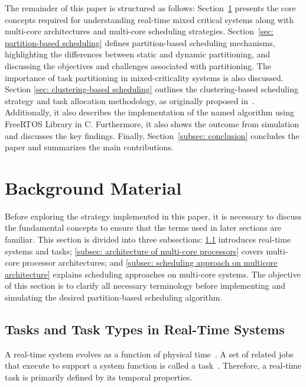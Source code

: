 \documentclass[conference]{IEEEtran}
\begin{document}
The remainder of this paper is structured as follows: 
Section~\ref{sec:fundamentals} presents the core concepts required for understanding real-time mixed critical systems along with multi-core architectures and multi-core scheduling strategies.
Section~\ref{sec: partition-based scheduling} defines partition-based scheduling mechanisms, highlighting the differences between static and dynamic partitioning, and discussing the objectives and challenges associated with partitioning. The importance of task partitioning in mixed-criticality systems is also discussed. 
Section \ref{sec: clustering-based scheduling} outlines the clustering-based scheduling strategy and task allocation methodology, as originally proposed in~\cite{AbdallahGB24}. Additionally, it also 
describes the implementation of the named algorithm using FreeRTOS Library in C. Furthermore, it also shows the outcome from simulation and discusses the key findings. 
Finally, Section~\ref{subsec: conclusion} concludes the paper and summarizes the main contributions.




\section{Background Material}
\label{sec:fundamentals}
Before exploring the strategy implemented in this paper, it is necessary to discuss the fundamental concepts to ensure that the terms used in later sections are familiar. This section is divided into three subsections: \ref{subsec:task and task types} introduces real-time systems and tasks; \ref{subsec: architecture of multi-core processors} covers multi-core processor architectures; and \ref{subsec: scheduling approach on multicore architecture} explains scheduling approaches on multi-core systems. The objective of this section is to clarify all necessary terminology before implementing and simulating the desired partition-based scheduling algorithm.

\subsection{Tasks and Task Types in Real-Time Systems}
\label{subsec:task and task types}
A real-time system evolves as a function of physical time~\cite{kopetzDist}. A set of related jobs that execute to support a system function is called a task~\cite{9999}. Therefore, a real-time task is primarily defined by its temporal properties.
\end{document}
